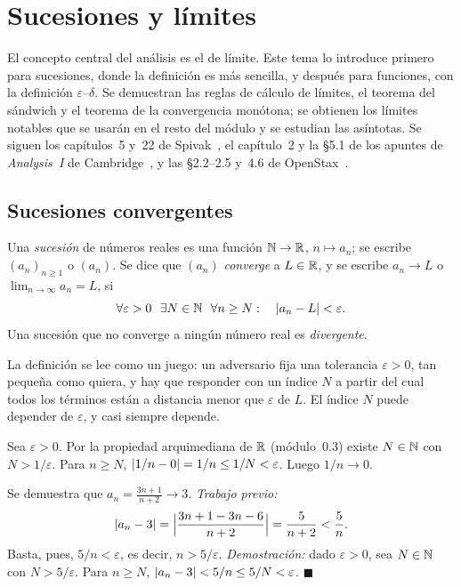 \chapter{Sucesiones y límites}
\label{tema:2}

El concepto central del análisis es el de límite. Este tema lo introduce primero para sucesiones, donde la definición es más sencilla, y después para funciones, con la definición $\varepsilon$--$\delta$. Se demuestran las reglas de cálculo de límites, el teorema del sándwich y el teorema de la convergencia monótona; se obtienen los límites notables que se usarán en el resto del módulo y se estudian las asíntotas. Se siguen los capítulos~5 y~22 de Spivak~\cite{spivak}, el capítulo~2 y la §5.1 de los apuntes de \emph{Analysis~I} de Cambridge~\cite{cambA1}, y las §2.2--2.5 y~4.6 de OpenStax~\cite{osc1}.

\section{Sucesiones convergentes}

\begin{definicion}\label{def:limite-sucesion}
Una \emph{sucesión} de números reales es una función $\mathbb{N}\to\mathbb{R}$, $n\mapsto a_n$; se escribe $(a_n)_{n\ge1}$ o $(a_n)$. Se dice que $(a_n)$ \emph{converge} a $L\in\mathbb{R}$, y se escribe $a_n\to L$ o $\lim_{n\to\infty}a_n=L$, si
\[
\forall\varepsilon>0\ \ \exists N\in\mathbb{N}\ \ \forall n\ge N:\quad \lvert a_n-L\rvert<\varepsilon.
\]
Una sucesión que no converge a ningún número real es \emph{divergente}.
\end{definicion}

La definición se lee como un juego: un adversario fija una tolerancia $\varepsilon>0$, tan pequeña como quiera, y hay que responder con un índice $N$ a partir del cual todos los términos están a distancia menor que $\varepsilon$ de $L$. El índice $N$ puede depender de $\varepsilon$, y casi siempre depende.

\begin{ejemplo}[$1/n\to0$]\label{ej:1n}
Sea $\varepsilon>0$. Por la propiedad arquimediana de $\mathbb{R}$ (módulo~0.3) existe $N\in\mathbb{N}$ con $N>1/\varepsilon$. Para $n\ge N$, $\lvert1/n-0\rvert=1/n\le1/N<\varepsilon$. Luego $1/n\to0$.
\end{ejemplo}

\begin{ejemplo}\label{ej:eN}
Se demuestra que $a_n=\frac{3n+1}{n+2}\to3$. \emph{Trabajo previo:}
\[
\lvert a_n-3\rvert=\Bigl|\frac{3n+1-3n-6}{n+2}\Bigr|=\frac{5}{n+2}<\frac5n.
\]
Basta, pues, $5/n<\varepsilon$, es decir, $n>5/\varepsilon$. \emph{Demostración:} dado $\varepsilon>0$, sea $N\in\mathbb{N}$ con $N>5/\varepsilon$. Para $n\ge N$, $\lvert a_n-3\rvert<5/n\le5/N<\varepsilon$. \hfill$\blacksquare$
\end{ejemplo}

